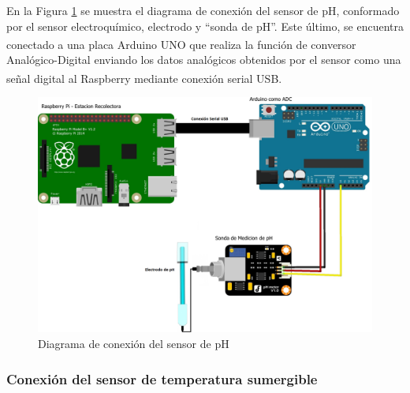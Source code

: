        \par En la Figura \ref{fig:ConexionSensorpH} se muestra el diagrama de conexión del sensor de pH, conformado por el sensor electroquímico, electrodo y ``sonda de pH''. Este último, se encuentra conectado a una placa Arduino\textsuperscript{\textregistered} UNO que realiza la función de conversor Analógico-Digital enviando los datos analógicos obtenidos por el sensor como una señal digital al Raspberry\textsuperscript{\textregistered} mediante conexión serial USB.
        
        \begin{figure}[h]
            \centering
            \includegraphics[scale=0.25]{hardware/DiagramaSensordepH_bb2.jpg}
            \caption{Diagrama de conexión del sensor de pH}
            \label{fig:ConexionSensorpH}
        \end{figure}

    \subsubsection{Conexión del sensor de temperatura sumergible}

